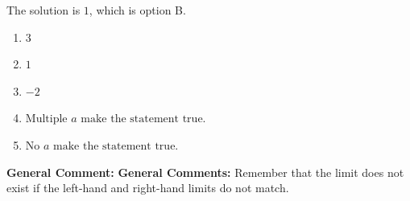 \documentclass{extbook}[14pt]
\begin{document}
\begin{enumerate}
{The solution is \( 1 \), which is option B.\begin{enumerate}[label=\Alph*.]
\item \( 3 \)


\item \( 1 \)


\item \( -2 \)


\item \( \text{Multiple } a \text{ make the statement true}. \)


\item \( \text{No } a \text{ make the statement true}. \)


\end{enumerate}

\textbf{General Comment:} \textbf{General Comments:} Remember that the limit does not exist if the left-hand and right-hand limits do not match.
}
\end{enumerate}
\end{document}
